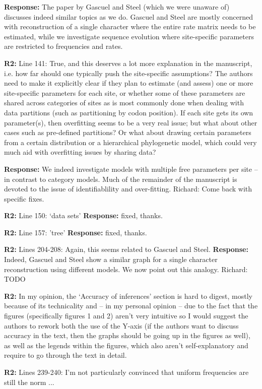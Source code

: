 \documentclass[aps,rmp,onecolumn]{revtex4-1}
\newcommand{\Richard}[1]{{\color{drab}Richard: #1}}
\newcommand{\refb}[1]{\textbf{R2:} #1}
\newcommand{\response}[1]{{\color{black}\textbf{Response:} #1}}
\begin{document}
\response{The paper by Gascuel and Steel (which we were unaware of) discusses indeed similar topics as we do. Gascuel and Steel are mostly concerned with reconstruction of a single character where the entire rate matrix needs to be estimated, while we investigate sequence evolution where site-specific parameters are restricted to frequencies and rates. }

\refb{Line 141: True, and this deserves a lot more explanation in the manuscript, i.e. how far should one typically push the site-specific assumptions? The authors need to make it explicitly clear if they plan to estimate (and assess) one or more site-specific parameters for each site, or whether some of these parameters are shared across categories of sites as is most commonly done when dealing with data partitions (such as partitioning by codon position). If each site gets its own parameter(s), then overfitting seems to be a very real issue; but what about other cases such as pre-defined partitions? Or what about drawing certain parameters from a certain distribution or a hierarchical phylogenetic model, which could very much aid with overfitting issues by sharing data?}

\response{We indeed investigate models with multiple free parameters per site -- in contrast to category models. Much of the remainder of the manuscript is devoted to the issue of identifiablility and over-fitting. }
\Richard{Come back with specific fixes.}


\refb{Line 150: `data sets'}
\response{fixed, thanks.}

\refb{Line 157: 'tree'}
\response{fixed, thanks.}

\refb{Lines 204-208: Again, this seems related to Gascuel and Steel.}
\response{Indeed, Gascuel and Steel show a similar graph for a single character reconstruction using different models. We now point out this analogy.}
\Richard{TODO}

\refb{In my opinion, the ‘Accuracy of inferences’ section is hard to digest, mostly because of its technicality and -- in my personal opinion -- due to the fact that the figures (specifically figures 1 and 2) aren’t very intuitive so I would suggest the authors to rework both the use of the Y-axis (if the authors want to discuss accuracy in the text, then the graphs should be going up in the figures as well), as well as the legends within the figures, which also aren’t self-explanatory and require to go through the text in detail.}


\refb{Lines 239-240: I’m not particularly convinced that uniform frequencies are still the norm ...}
\end{document}
